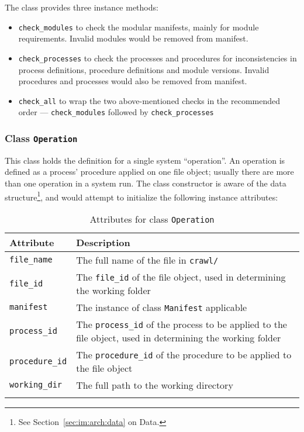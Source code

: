 The class provides three instance methods:

\begin{itemize}
    \item \texttt{check\_modules} to check the modular manifests, mainly
    for module requirements. Invalid modules would be removed from manifest.
    \item \texttt{check\_processes} to check the processes and procedures
    for inconsistencies in process definitions, procedure definitions and
    module versions. Invalid procedures and processes would also be removed
    from manifest.
    \item \texttt{check\_all} to wrap the two above-mentioned checks in
    the recommended order --- \texttt{check\_modules} followed by
    \texttt{check\_processes}
\end{itemize}

\subsubsection{Class \texttt{Operation}}

This class holds the definition for a single system ``operation''. An
operation is defined as a process' procedure applied on one file object;
usually there are more than one operation in a system run. The class
constructor is aware of the data structure\footnote{See
Section~\ref{sec:im:arch:data} on Data.}, and would attempt to initialize
the following instance attributes:

\begin{longtabu}{X[1,l]X[4,l]}
    \textbf{Attribute} & \textbf{Description} \\
    \midrule
    \endhead{}
    \texttt{file\_name} &
    The full name of the file in \texttt{crawl/} \\
    \texttt{file\_id} &
    The \texttt{file\_id} of the file object, used in determining
    the working folder \\
    \texttt{manifest} &
    The instance of class \texttt{Manifest} applicable \\
    \texttt{process\_id} &
    The \texttt{process\_id} of the process to be applied to the
    file object, used in determining the working folder \\
    \texttt{procedure\_id} &
    The \texttt{procedure\_id} of the procedure to be applied to the
    file object \\
    \texttt{working\_dir} & 
    The full path to the working directory \\
    \caption{Attributes for class \texttt{Operation}}
\end{longtabu}

